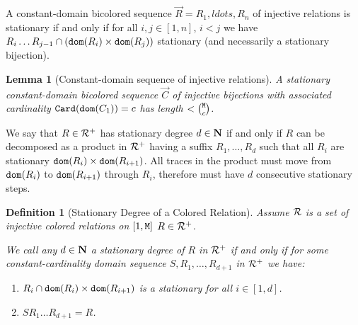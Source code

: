 \documentclass{lmcs}
\newtheorem{lemma}[theorem]{Lemma}
\newtheorem{definition}[theorem]{Definition}
\begin{document}
A constant-domain bicolored sequence $\vec{R}=R_1, ldots, R_n$
of injective relations is stationary if and only if for all $i,j \in [1,n]$, $i < j$ we have
$R_i \ldots R_{j-1} \cap ({\tt dom}(R_i) \times {\tt dom}(R_j))$ stationary (and necessarily
a stationary bijection).

\begin{lemma}[Constant-domain sequence of injective relations]
\label{lemma-constant-injective}
A stationary constant-domain bicolored sequence $\vec{C}$ of injective bijections 
with associated cardinality ${\tt Card}({\tt dom}(C_1))=c$ has length $< \newton{\MaxInd}{c}$.
\end{lemma}

%
%
%
%
%

We say that $R \in {\mathcal R}^+$ has stationary degree $d \in {\bf N}$ if and only if
$R$ can be decomposed as a product in ${\mathcal R}^+$ having a suffix 
$R_1, \ldots, R_{d}$ such that all $R_i$ are stationary 
${\tt dom}(R_i) \times {\tt dom}(R_{i+1})$. All traces in the product must move from 
${\tt dom}(R_i)$ to ${\tt dom}(R_{i+1})$ through $R_i$, therefore must have $d$ consecutive
stationary steps. 

\begin{definition}[Stationary Degree of a Colored Relation]
Assume ${\mathcal R}$ is a set of injective colored relations on $[1,{\tt M}]$
$R \in {\mathcal R}^+$. 

We call any $d \in {\bf N}$ a stationary degree of $R$  in ${\mathcal R}^+$ 
if and only if for some constant-cardinality domain sequence 
$S, R_1, \ldots, R_{d+1}$ in ${\mathcal R}^+$ we have:

\begin{enumerate}

\item
$R_i \cap {\tt dom}(R_i) \times {\tt dom}(R_{i+1})$ is a stationary for all $i \in [1,d]$. 

\item
$S R_1 \ldots R_{d+1} = R$.

\end{enumerate}
\end{definition}
\end{document}
